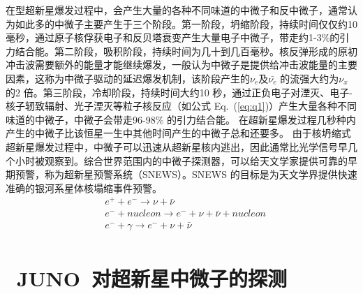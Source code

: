 在\uppercase\expandafter{}型超新星爆发过程中，会产生大量的各种不同味道的中微子和反中微子，通常认为如此多的中微子主要产生于三个阶段。第一阶段，坍缩阶段，持续时间仅仅约10毫秒，通过原子核俘获电子和反贝塔衰变产生大量电子中微子，带走约1-3\%的引力结合能。第二阶段，吸积阶段，持续时间为几十到几百毫秒。核反弹形成的原初冲击波需要额外的能量才能继续爆发，一般认为中微子是提供给冲击波能量的主要因素，这称为中微子驱动的延迟爆发机制，该阶段产生的$\nu_e$及$\bar{\nu_e}$ 的流强大约为$\nu_x$的2 倍。第三阶段，冷却阶段，持续时间大约10 秒，通过正负电子对湮灭、电子-核子轫致辐射、光子湮灭等粒子核反应（如公式 Eq.~(\ref{eq:q1})）产生大量各种不同味道的中微子，中微子会带走96-98\% 的引力结合能。
在超新星爆发过程几秒种内产生的中微子比该恒星一生中其他时间产生的中微子总和还要多。%
由于核坍缩式超新星爆发过程中，中微子可以迅速从超新星核内逃出，因此通常比光学信号早几个小时被观察到。综合世界范围内的中微子探测器，可以给天文学家提供可靠的早期预警，称为超新星预警系统（SNEWS）。SNEWS 的目标是为天文学界提供快速准确的银河系星体核塌缩事件预警。
\begin{equation}\label{eq:q1}
\begin{split}
 & e^{+}+e^{-} \rightarrow \nu+\bar{\nu} \\
 & e^{-}+nucleon \rightarrow e^{-}+\nu+\bar{\nu} +nucleon\\
 & e^{-}+\gamma \rightarrow  e^{-}+\nu+\bar{\nu} \\
\end{split}
\end{equation}
\section{~JUNO~对超新星中微子的探测}
